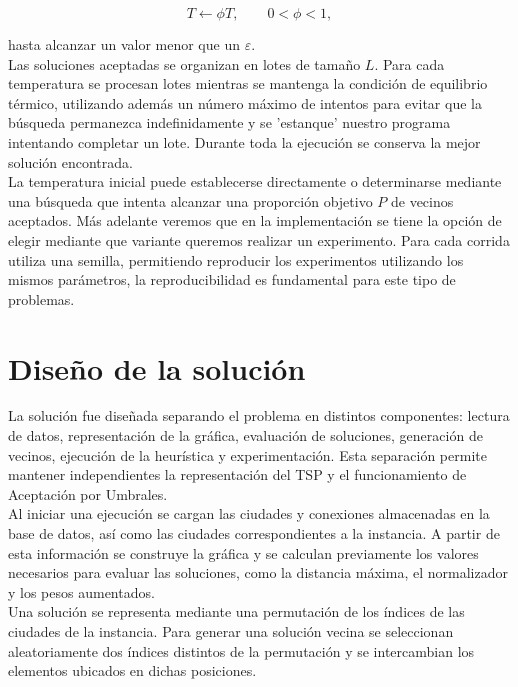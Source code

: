 \documentclass[twoside,11pt]{article}
\begin{document}
\[
T\leftarrow\phi T, \qquad 0<\phi<1,
\]

hasta alcanzar un valor menor que  un $\varepsilon$.\\

Las soluciones aceptadas se organizan en lotes de tamaño $L$. Para cada temperatura se procesan lotes mientras se mantenga la condición de equilibrio térmico, utilizando además un número máximo de intentos para evitar que la búsqueda permanezca indefinidamente  y se 'estanque' nuestro programa intentando completar un lote. Durante toda la ejecución se conserva la mejor solución encontrada.\\

La temperatura inicial puede establecerse directamente o determinarse mediante una búsqueda que intenta alcanzar una proporción objetivo $P$ de vecinos aceptados. Más adelante veremos que en la implementación se tiene la opción de elegir mediante que variante queremos realizar un experimento. Para cada corrida utiliza una semilla, permitiendo reproducir los experimentos utilizando los mismos parámetros, la reproducibilidad es fundamental para este tipo de problemas.

\section{Diseño de la solución}

La solución fue diseñada separando el problema en distintos componentes: lectura de datos, representación de la gráfica, evaluación de soluciones, generación de vecinos, ejecución de la heurística y experimentación. Esta separación permite mantener independientes la representación del TSP y el funcionamiento de Aceptación por Umbrales.\\

Al iniciar una ejecución se cargan las ciudades y conexiones almacenadas en la base de datos, así como las ciudades correspondientes a la instancia. A partir
de esta información se construye la gráfica y se calculan previamente los valores necesarios para evaluar las soluciones, como la distancia máxima, el normalizador y los pesos aumentados.\\

Una solución se representa mediante una permutación de los índices de las ciudades de la instancia. Para generar una solución vecina se seleccionan aleatoriamente dos índices distintos de la permutación y se intercambian los elementos ubicados en dichas posiciones. \\
\end{document}
